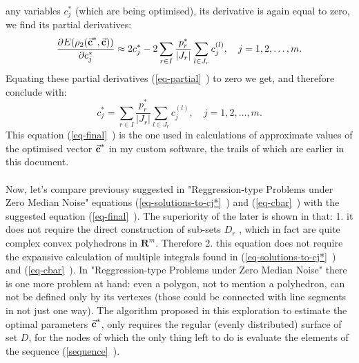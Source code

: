 any variables $c_{j}^{*}$ (which are being optimised), its derivative is again equal to zero, we find its partial derivatives:
\begin{equation}
\frac{\partial E (\rho_{2}(\vec{\textbf{c}}^{*},\vec{\textbf{c}}))}{\partial c_{j}^{*}} \approx 2c_{j}^{*} - 2 \sum\limits_{r \in I} \frac{p_{r}^{*}}{\left| J_{r} \right|} \sum\limits_{l \in J_{r}} c_{j}^{(l)}, \quad j=1,2,\dots,m. \label{eq-partial}
\end{equation}
Equating these partial derivatives (\vref{eq-partial}~) to zero we get, and therefore conclude with:
\begin{equation}
c_{j}^{*} = \sum\limits_{r \in I} \frac{p_{r}^{*}}{\left| J_{r} \right|} \sum\limits_{l \in J_{r}} c_{j}^{(l)}, \quad j=1,2,\dots,m. \label{eq-final}
\end{equation}
This equation (\vref{eq-final}~) is the one used in calculations of approximate values of the optimised vector $\vec{\textbf{c}}^{*}$ in my custom software, the trails of which are earlier  in this document.\\
\\
Now, let's compare previousy suggested in "Reggression-type Problems under Zero Median Noise" equations (\vref{eq-solutions-to-cj*}~) and (\vref{eq-cbar}~) with the suggested equation (\vref{eq-final}~). The superiority of the later is shown in that: 1. it does not require the direct construction of sub-sets $D_{r}$
, which in fact are quite complex convex polyhedrons in $\boldsymbol{R}^{m}$. Therefore 2. this equation does not require the expansive calculation of multiple integrals found in (\vref{eq-solutions-to-cj*}~) and (\vref{eq-cbar}~).  In "Reggression-type Problems under Zero Median Noise" there is one more problem at hand: even a polygon, not to mention a polyhedron, can not be defined only by its vertexes (those could be connected with line segments in not just one way). The algorithm proposed in this exploration to estimate the optimal parameters $\vec{\textbf{c}}^{*}$, only requires the regular (evenly distributed) surface of set $D$, for the nodes of which the only thing left to do is evaluate the elements of the sequence (\vref{sequence}~).

\newpage






